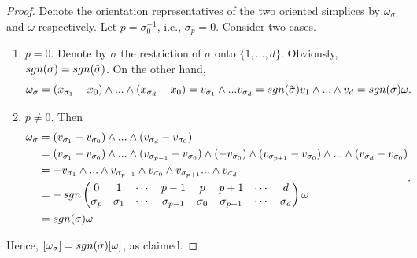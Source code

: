 \documentclass[10pt,a4paper]{amsart}
\newcommand{\sgn}{\mathop{\rm sgn}\nolimits}   %
\begin{document}
\begin{proof}
  Denote the orientation representatives of the two oriented simplices by $\omega_{\sigma}$ and $\omega$ respectively. Let $p = \sigma^{-1}_0$, i.e., $\sigma_p = 0$. Consider two cases.
  \begin{enumerate}
    \item
      $p = 0$. Denote by $\tilde{\sigma}$ the restriction of $\sigma$ onto $\{1, ..., d\}$. Obviously, $\sgn(\sigma) = \sgn( \tilde{\sigma})$. On the other hand,
      \begin{equation*}
        \omega_{\sigma}
          = (x_{\sigma_1} - x_0) \wedge ... \wedge (x_{\sigma_d} - x_0) 
          = v_{\sigma_1} \wedge ... v_{\sigma_d} = \sgn(\tilde{\sigma}) v_1 \wedge ... \wedge v_d = \sgn(\sigma) \omega.
      \end{equation*}
    \item
      $p \neq 0$. Then
      \begin{equation*}
        \begin{split}
          \omega_{\sigma}
            & = (v_{\sigma_1} - v_{\sigma_0}) \wedge ... \wedge (v_{\sigma_d} - v_{\sigma_0}) \\
            & = (v_{\sigma_1} - v_{\sigma_0}) \wedge ... \wedge (v_{\sigma_{p - 1}} - v_{\sigma_0}) \wedge (-v_{\sigma_0}) \wedge (v_{\sigma_{p + 1}} - v_{\sigma_0}) \wedge ... \wedge (v_{\sigma_d} - v_{\sigma_0}) \\
            & = - v_{\sigma_1} \wedge ... \wedge v_{\sigma_{p - 1}} \wedge v_{\sigma_0} \wedge v_{\sigma_{p + 1}} ... \wedge v_{\sigma_d} \\
            & = - \sgn
              \begin{pmatrix}
                0 & 1 & \cdots & p - 1 & p & p + 1 & \cdots & d \\
                \sigma_p & \sigma_1 &  \cdots & \sigma_{p - 1} & \sigma_0 & \sigma_{p + 1}& \cdots & \sigma_d
              \end{pmatrix}
              \omega \\ 
            & = \sgn(\sigma) \omega
        \end{split}.
      \end{equation*}
  \end{enumerate}
  Hence, $[\omega_{\sigma}] = \sgn(\sigma) [\omega]$, as claimed.
\end{proof}
\end{document}
